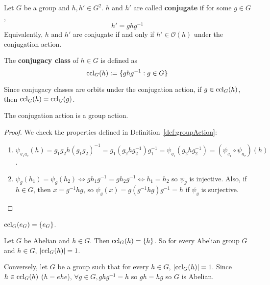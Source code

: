 \begin{definition}
	Let $G$ be a group and $h, h' \in G^2$. $h$ and $h'$ are called \textbf{conjugate} if for some $g \in G$,
	\[
		h' = g h g^{-1}
	\]
	Equivalently, $h$ and $h'$ are conjugate if and only if $h' \in \mathcal{O}(h)$ under the conjugation action. 
\end{definition}

\begin{definition}
	The \textbf{conjugacy class} of $h \in G$ is defined as
	\[
		\text{ccl}_G(h) := \{ g h g^{-1}: g \in G \}
	\]
\end{definition}

\begin{remark}
	Since conjugacy classes are orbits under the conjugation action, if $g \in \text{ccl}_G(h)$, then $\text{ccl}_G(h) = \text{ccl}_G(g)$.
\end{remark}

\begin{proposition}
	The conjugation action is a group action.
\end{proposition}

\begin{proof}
	We check the properties defined in Definition~\ref{def:groupAction}:
	\begin{enumerate}
		\item $\psi_{g_1 g_2} (h) = g_1 g_2 h (g_1 g_2)^{-1} = g_1 (g_2 h g_2^{-1}) g_1^{-1} = \psi_{g_1}(g_2 h g_2^{-1}) = (\psi_{g_1} \circ \psi_{g_2})(h)$.
		\item $\psi_g(h_1) = \psi_g(h_2) \Longleftrightarrow g h_1 g^{-1} = g h_2 g^{-1} \Longleftrightarrow h_1 = h_2$ so $\psi_g$ is injective. Also, if $h \in G$, then $x = g^{-1} h g$, so $\psi_g(x) = g(g^{-1} h g) g^{-1} = h$ if $\psi_g$ is surjective.
	\end{enumerate}
\end{proof}

\begin{example}
	$\text{ccl}_G(e_G) = \{ e_G \}$.
\end{example}

\begin{example}
	Let $G$ be Abelian and $h \in G$. Then $\text{ccl}_G(h) = \{ h \}$. So for every Abelian group $G$ and $h \in G$, $|\text{ccl}_G(h)| = 1$.

	Conversely, let $G$ be a group such that for every $h \in G$, $|\text{ccl}_G(h)| = 1$. Since $h \in \text{ccl}_G(h)$ ($h = ehe$), $\forall g \in G, g h g^{-1} = h$ so $gh = hg$ so $G$ is Abelian.
\end{example}


